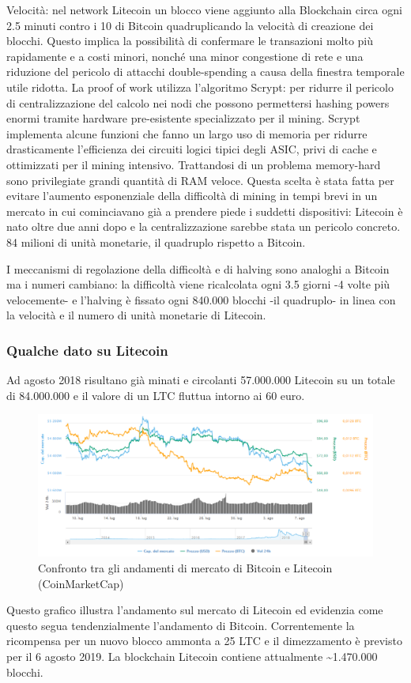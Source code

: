 Velocità: nel network Litecoin un blocco viene aggiunto alla Blockchain circa ogni 2.5 minuti contro i 10 di Bitcoin quadruplicando la velocità di creazione dei blocchi. Questo implica la possibilità di confermare le transazioni molto più rapidamente e a costi minori, nonché una minor congestione di rete e una riduzione del pericolo di attacchi double-spending a causa della finestra temporale utile ridotta.
La proof of work utilizza l’algoritmo Scrypt: per ridurre il pericolo di centralizzazione del calcolo nei nodi che possono permettersi hashing powers enormi tramite hardware pre-esistente specializzato per il mining.
Scrypt implementa alcune funzioni che fanno un largo uso di memoria per ridurre drasticamente l’efficienza dei circuiti logici tipici degli ASIC, privi di cache e ottimizzati per il mining intensivo. Trattandosi di un problema memory-hard sono privilegiate grandi quantità di RAM veloce. 
Questa scelta è stata fatta per evitare l’aumento esponenziale della difficoltà di mining in tempi brevi in un mercato in cui cominciavano già a prendere piede i suddetti dispositivi: Litecoin è nato oltre due anni dopo e la centralizzazione sarebbe stata un pericolo concreto.
84 milioni di unità monetarie, il quadruplo rispetto a Bitcoin.

I meccanismi di regolazione della difficoltà e di halving sono analoghi a Bitcoin ma i numeri cambiano: la difficoltà viene ricalcolata ogni 3.5 giorni -4 volte più velocemente- e l’halving è fissato ogni 840.000 blocchi -il quadruplo- in linea con la velocità e il numero di unità monetarie di Litecoin.

\subsubsection{Qualche dato su Litecoin}
Ad agosto 2018 risultano già minati e circolanti 57.000.000 Litecoin su un totale di 84.000.000 e il valore di un LTC fluttua intorno ai 60 euro.

\begin{figure}[h!]
	\centering
	\includegraphics[width=1.0\linewidth]{images/LitecoinCoinMarketCap}
	\caption{Confronto tra gli andamenti di mercato di Bitcoin e Litecoin (CoinMarketCap)}
	\label{fig:litecoincoinmarketcap}
\end{figure}


Questo grafico illustra l’andamento sul mercato di Litecoin ed evidenzia come questo segua tendenzialmente l’andamento di Bitcoin.
Correntemente la ricompensa per un nuovo blocco ammonta a 25 LTC e il dimezzamento è previsto per il 6 agosto 2019.
La blockchain Litecoin contiene attualmente \~{}1.470.000 blocchi.

